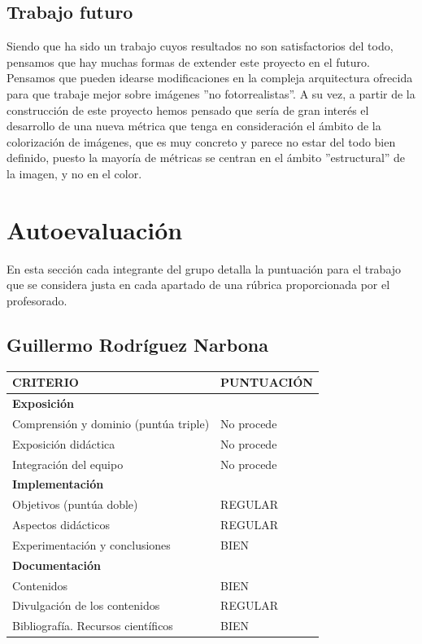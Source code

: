 \documentclass[a4paper]{article}
\begin{document}
\subsection{Trabajo futuro}
Siendo que ha sido un trabajo cuyos resultados no son satisfactorios del todo, pensamos que hay muchas formas de extender este proyecto en el futuro. Pensamos que pueden idearse modificaciones en la compleja arquitectura ofrecida para que trabaje mejor sobre imágenes ''no fotorrealistas''. A su vez, a partir de la construcción de este proyecto hemos pensado que sería de gran interés el desarrollo de una nueva métrica que tenga en consideración el ámbito de la colorización de imágenes, que es muy concreto y parece no estar del todo bien definido, puesto la mayoría de métricas se centran en el ámbito ''estructural'' de la imagen, y no en el color.

\section{Autoevaluación}

En esta sección cada integrante del grupo detalla la puntuación para el trabajo que se considera justa en cada apartado de una rúbrica proporcionada por el profesorado. 


\subsection{Guillermo Rodríguez Narbona}

\begin{table}[h!]
	\centering
	\begin{tabular}{|l|l|}
		\hline
		\textbf{CRITERIO} & \textbf{PUNTUACIÓN} \\ \hline
		
		\multicolumn{2}{|l|}{\textbf{Exposición}} \\ \hline
		Comprensión y dominio (puntúa triple) & No procede \\ \hline
		Exposición didáctica & No procede \\ \hline
		Integración del equipo & No procede \\ \hline
		
		\multicolumn{2}{|l|}{\textbf{Implementación}} \\ \hline
		Objetivos (puntúa doble) & REGULAR \\ \hline
		Aspectos didácticos & REGULAR \\ \hline
		Experimentación y conclusiones & BIEN \\ \hline
		
		\multicolumn{2}{|l|}{\textbf{Documentación}} \\ \hline
		Contenidos & BIEN \\ \hline
		Divulgación de los contenidos & REGULAR \\ \hline
		Bibliografía. Recursos científicos & BIEN \\ \hline
		
	\end{tabular}
\end{table}
\end{document}

